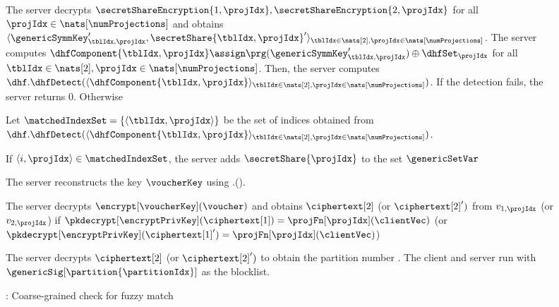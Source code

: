 \begin{figure}[th!]
\begin{mdframed}
The server decrypts $\secretShareEncryption{1, \projIdx}, \secretShareEncryption{2, \projIdx}$
for all $\projIdx \in \nats[\numProjections]$ and obtains $\langle \genericSymmKey_{\tblIdx, \projIdx}', \secretShare{\tblIdx, \projIdx}' \rangle_{\tblIdx \in \nats[2], \projIdx \in \nats[\numProjections]}$. The server computes $\dhfComponent{\tblIdx, \projIdx} \assign \prg(\genericSymmKey_{\tblIdx, \projIdx}') \oplus \dhfSet_{\projIdx}$ for all $\tblIdx \in \nats[2], \projIdx \in \nats[\numProjections]$. 
Then, the server computes $\dhf.\dhfDetect(\langle \dhfComponent{\tblIdx, \projIdx} \rangle_{\tblIdx \in \nats[2], \projIdx \in \nats[\numProjections]})$. If the detection fails, the server returns 0. Otherwise

\enumListStartResume
\item Let $\matchedIndexSet = \{ \langle \tblIdx, \projIdx \rangle \}$ be the set of indices obtained from $\dhf.\dhfDetect(\langle \dhfComponent{\tblIdx, \projIdx} \rangle_{\tblIdx \in \nats[2], \projIdx \in \nats[\numProjections]})$. 
\item \label{fuzzy:pre:dhf1} If $\langle i, \projIdx \rangle \in \matchedIndexSet$, the server adds $\secretShare{\projIdx}$ to the set $\genericSetVar$
\item The server reconstructs the key $\voucherKey$ using \secretSharingScheme.\SSCombine(\genericSetVar). 
\item The server decrypts $\encrypt[\voucherKey](\voucher)$ and obtains $\ciphertext[2]$ (or $\ciphertext[2]')$ from $v_{1, \projIdx}$ (or $v_{2, \projIdx}$) if $\pkdecrypt[\encryptPrivKey](\ciphertext[1]) = \projFn[\projIdx](\clientVec)$ (or $\pkdecrypt[\encryptPrivKey](\ciphertext[1]') = \projFn[\projIdx](\clientVec)$)
\item \label{fuzzy:pre:dhf2} The server decrypts $\ciphertext[2]$ (or $\ciphertext[2]')$ to obtain the partition number \partitionIdx. The client and server run \protocolFM with $\genericSig[\partition{\partitionIdx}]$ as the blocklist. 
\enumListEnd

\end{mdframed}
\caption{\protocolFMP: Coarse-grained check for fuzzy match}
\label{fig:fuzzy:pre}
\end{figure}
\fi 
